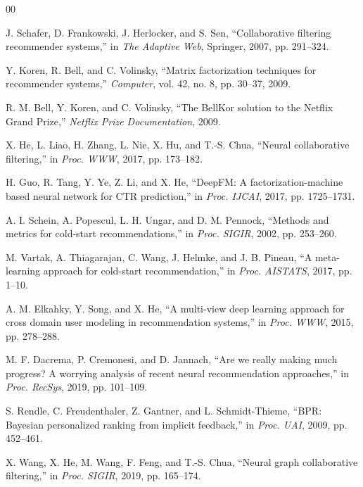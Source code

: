 \documentclass[journal]{IEEEtran}
\begin{document}
\begin{thebibliography}{00}

J. Schafer, D. Frankowski, J. Herlocker, and S. Sen, ``Collaborative filtering recommender systems,'' in \textit{The Adaptive Web}, Springer, 2007, pp. 291--324.

Y. Koren, R. Bell, and C. Volinsky, ``Matrix factorization techniques for recommender systems,'' \textit{Computer}, vol. 42, no. 8, pp. 30--37, 2009.

R. M. Bell, Y. Koren, and C. Volinsky, ``The BellKor solution to the Netflix Grand Prize,'' \textit{Netflix Prize Documentation}, 2009.

X. He, L. Liao, H. Zhang, L. Nie, X. Hu, and T.-S. Chua, ``Neural collaborative filtering,'' in \textit{Proc. WWW}, 2017, pp. 173--182.

H. Guo, R. Tang, Y. Ye, Z. Li, and X. He, ``DeepFM: A factorization-machine based neural network for CTR prediction,'' in \textit{Proc. IJCAI}, 2017, pp. 1725--1731.

A. I. Schein, A. Popescul, L. H. Ungar, and D. M. Pennock, ``Methods and metrics for cold-start recommendations,'' in \textit{Proc. SIGIR}, 2002, pp. 253--260.

M. Vartak, A. Thiagarajan, C. Wang, J. Helmke, and J. B. Pineau, ``A meta-learning approach for cold-start recommendation,'' in \textit{Proc. AISTATS}, 2017, pp. 1--10.

A. M. Elkahky, Y. Song, and X. He, ``A multi-view deep learning approach for cross domain user modeling in recommendation systems,'' in \textit{Proc. WWW}, 2015, pp. 278--288.

M. F. Dacrema, P. Cremonesi, and D. Jannach, ``Are we really making much progress? A worrying analysis of recent neural recommendation approaches,'' in \textit{Proc. RecSys}, 2019, pp. 101--109.

S. Rendle, C. Freudenthaler, Z. Gantner, and L. Schmidt-Thieme, ``BPR: Bayesian personalized ranking from implicit feedback,'' in \textit{Proc. UAI}, 2009, pp. 452--461.

X. Wang, X. He, M. Wang, F. Feng, and T.-S. Chua, ``Neural graph collaborative filtering,'' in \textit{Proc. SIGIR}, 2019, pp. 165--174.


\end{thebibliography}
\end{document}
